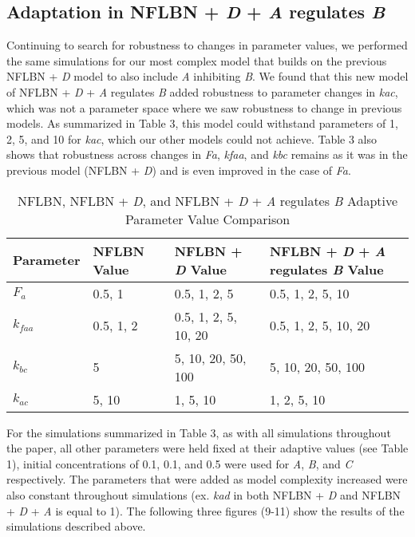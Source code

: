 \documentclass{article}
\begin{document}
\subsection{Adaptation in NFLBN + \textit{D} + \textit{A} regulates \textit{B}}

Continuing to search for robustness to changes in parameter values, we performed the same simulations for our most complex model that builds on the previous NFLBN + \textit{D} model to also include \textit{A} inhibiting \textit{B}. We found that this new model of NFLBN + \textit{D} + \textit{A} regulates \textit{B} added robustness to parameter changes in \textit{kac}, which was not a parameter space where we saw robustness to change in previous models. As summarized in Table 3, this model could withstand parameters of 1, 2, 5, and 10 for \textit{kac}, which our other models could not achieve. Table 3 also shows that robustness across changes in \textit{Fa}, \textit{kfaa}, and \textit{kbc} remains as it was in the previous model (NFLBN + \textit{D}) and is even improved in the case of \textit{Fa}. 

\begin{table}[h]
    \centering
    \caption{NFLBN, NFLBN + \textit{D}, and NFLBN + \textit{D} + \textit{A} regulates \textit{B} Adaptive Parameter Value Comparison}
    \begin{tabular}{@{}llll@{}}
        \toprule
        Parameter & NFLBN Value & NFLBN + \textit{D} Value & NFLBN + \textit{D} + \textit{A} regulates \textit{B} Value\\ 
        \midrule
        \(F_a\) & 0.5, 1 & 0.5, 1, 2, 5 & 0.5, 1, 2, 5, 10\\
        \(k_{faa}\) & 0.5, 1, 2 & 0.5, 1, 2, 5, 10, 20 & 0.5, 1, 2, 5, 10, 20 \\
        \(k_{bc}\) & 5 & 5, 10, 20, 50, 100 & 5, 10, 20, 50, 100\\
        \(k_{ac}\) & 5, 10 & 1, 5, 10 & 1, 2, 5, 10\\
        \bottomrule
    \end{tabular}
    \label{tab:parameters}
\end{table}

For the simulations summarized in Table 3, as with all simulations throughout the paper, all other parameters were held fixed at their adaptive values (see Table 1), initial concentrations of 0.1, 0.1, and 0.5 were used for \textit{A}, \textit{B}, and \textit{C} respectively. The parameters that were added as model complexity increased were also constant throughout simulations (ex. \textit{kad} in both NFLBN + \textit{D} and NFLBN + \textit{D} + \textit{A} is equal to 1). The following three figures (9-11) show the results of the simulations described above. 
\end{document}
